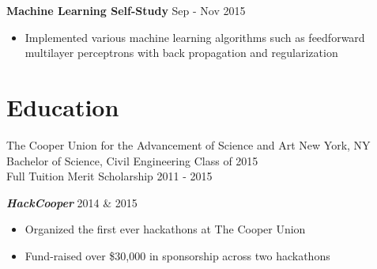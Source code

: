 \documentclass[overlapped]{res}
\begin{document}
\begin{resume}
    {\bf Machine Learning Self-Study} \hfill Sep - Nov 2015
    \begin{itemize} \itemsep-2pt
        \item
          Implemented various machine learning algorithms such as feedforward multilayer perceptrons with back propagation and regularization
    \end{itemize}


    \section{Education}
    The Cooper Union for the Advancement of Science and Art \hfill New York, NY  \\
    Bachelor of Science, Civil Engineering              \hfill Class of 2015 \\
    Full Tuition Merit Scholarship                          \hfill 2011 - 2015


    {\bf {\em HackCooper\/}} \hfill 2014 \& 2015
    \begin{itemize} \itemsep-2pt
        \item
            Organized the first ever hackathons at The Cooper Union
        \item
            Fund-raised over \$30,000 in sponsorship across two hackathons
    \end{itemize}


\end{resume}
\end{document}
